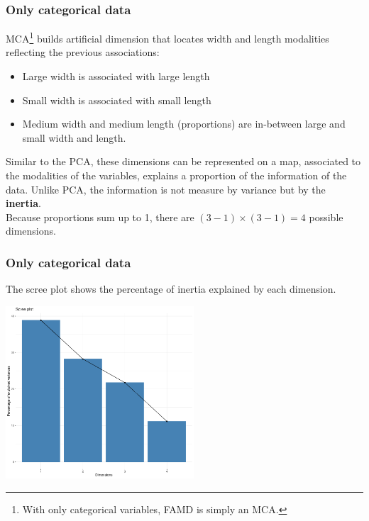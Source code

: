 \begin{frame}
\frametitle{Only categorical data}
MCA\footnote{With only categorical variables, FAMD is simply an MCA.} builds artificial dimension that locates width and length modalities reflecting the previous associations:
\begin{itemize}
\item Large width is associated with large length
\item Small width is associated with small length
\item Medium width and medium length (proportions) are in-between large and small width and length.
\end{itemize}
Similar to the PCA, these dimensions can be represented on a map, associated to the modalities of the variables, explains a proportion of the information of the data. Unlike PCA, the information is not measure by variance but by the {\bf inertia}.\\
\vspace{0.3cm}
Because proportions sum up to 1, there are $(3-1)\times (3-1) = 4$ possible dimensions. 
\end{frame}
\begin{frame}
\frametitle{Only categorical data}
The scree plot shows the percentage of inertia explained by each dimension.
\begin{center}
\includegraphics[width=7cm]{../../Graphs/FAMD_screeplot.pdf}
\end{center}
\end{frame}

